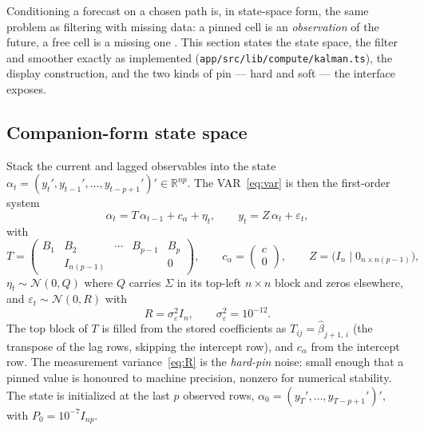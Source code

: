 \documentclass[11pt]{article}
\newcommand{\R}{\mathbb{R}}
\theoremstyle{plain}
\theoremstyle{remark}
\begin{document}
Conditioning a forecast on a chosen path is, in state-space form, the
same problem as filtering with missing data: a pinned cell is an
\emph{observation} of the future, a free cell is a missing one
\citep{BanburaGiannoneLenza2015, WaggonerZha1999}. This section states
the state space, the filter and smoother exactly as implemented
(\texttt{app/src/lib/compute/kalman.ts}), the display construction, and
the two kinds of pin --- hard and soft --- the interface exposes.

\subsection{Companion-form state space}\label{sec:ss}

Stack the current and lagged observables into the state
$\alpha_t = (y_t', y_{t-1}', \dots, y_{t-p+1}')' \in \R^{np}$. The
VAR~\eqref{eq:var} is then the first-order system
\begin{equation}\label{eq:ss}
  \alpha_t = T\,\alpha_{t-1} + c_\alpha + \eta_t,
  \qquad
  y_t = Z\,\alpha_t + \varepsilon_t,
\end{equation}
with
\begin{equation}\label{eq:companion}
  T = \begin{pmatrix}
    B_1 & B_2 & \cdots & B_{p-1} & B_p \\
    & I_{n(p-1)} & & & 0
  \end{pmatrix},
  \qquad
  c_\alpha = \begin{pmatrix} c \\ 0 \end{pmatrix},
  \qquad
  Z = \bigl(I_n \mid 0_{n \times n(p-1)}\bigr),
\end{equation}
$\eta_t \sim \mathcal{N}(0, Q)$ where $Q$ carries $\Sigma$ in its
top-left $n\times n$ block and zeros elsewhere, and
$\varepsilon_t \sim \mathcal{N}(0, R)$ with
\begin{equation}\label{eq:R}
  R = \sigma^2_\varepsilon I_n, \qquad \sigma^2_\varepsilon = 10^{-12}.
\end{equation}
The top block of $T$ is filled from the stored coefficients as
$T_{ij} = \hat\beta_{j+1,\,i}$ (the transpose of the lag rows, skipping
the intercept row), and $c_\alpha$ from the intercept row. The
measurement variance~\eqref{eq:R} is the \emph{hard-pin} noise: small
enough that a pinned value is honoured to machine precision, nonzero for
numerical stability. The state is initialized at the last $p$ observed
rows, $\alpha_0 = (y_T', \dots, y_{T-p+1}')'$, with
$P_0 = 10^{-7} I_{np}$.
\end{document}
